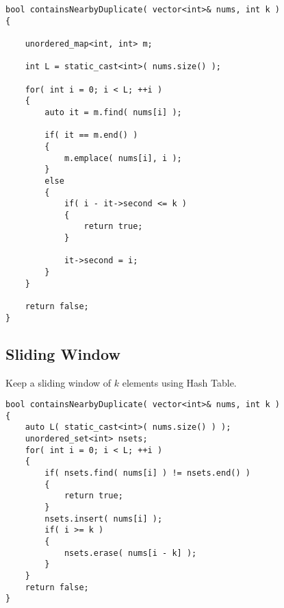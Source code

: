 \begin{lstlisting}[style=customc, caption={Hash Table}]
bool containsNearbyDuplicate( vector<int>& nums, int k )
{

    unordered_map<int, int> m;

    int L = static_cast<int>( nums.size() );

    for( int i = 0; i < L; ++i )
    {
        auto it = m.find( nums[i] );

        if( it == m.end() )
        {
            m.emplace( nums[i], i );
        }
        else
        {
            if( i - it->second <= k )
            {
                return true;
            }

            it->second = i;
        }
    }

    return false;
}

\end{lstlisting}


\subsection{Sliding Window}

Keep a sliding window of $k$ elements using Hash Table.

\begin{lstlisting}[style=customc, caption={Sliding Window}]
bool containsNearbyDuplicate( vector<int>& nums, int k )
{
    auto L( static_cast<int>( nums.size() ) );
    unordered_set<int> nsets;
    for( int i = 0; i < L; ++i )
    {
        if( nsets.find( nums[i] ) != nsets.end() )
        {
            return true;
        }
        nsets.insert( nums[i] );
        if( i >= k )
        {
            nsets.erase( nums[i - k] );
        }
    }
    return false;
}
\end{lstlisting}